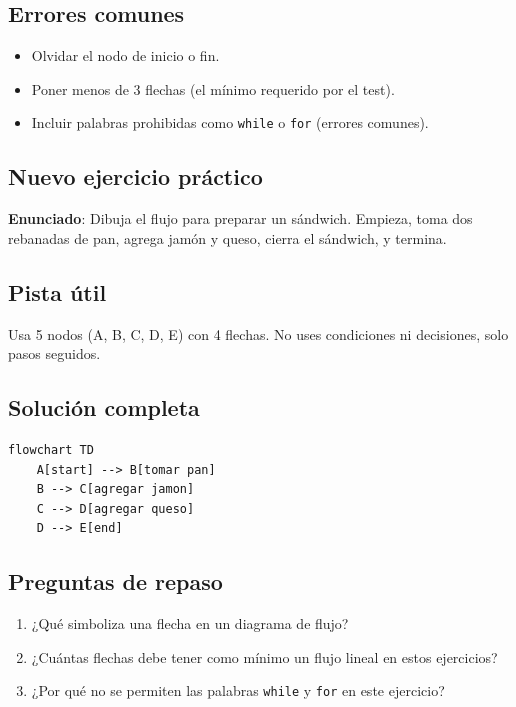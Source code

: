 \documentclass[12pt]{article}
\begin{document}
\subsection{Errores comunes}

\begin{itemize}
    \item Olvidar el nodo de inicio o fin.
    \item Poner menos de 3 flechas (el mínimo requerido por el test).
    \item Incluir palabras prohibidas como \texttt{while} o \texttt{for} (errores comunes).
\end{itemize}

\subsection{Nuevo ejercicio práctico}

\textbf{Enunciado}: Dibuja el flujo para preparar un sándwich. Empieza, toma dos rebanadas de pan, agrega jamón y queso, cierra el sándwich, y termina.

\subsection{Pista útil}

Usa 5 nodos (A, B, C, D, E) con 4 flechas. No uses condiciones ni decisiones, solo pasos seguidos.

\subsection{Solución completa}

\begin{lstlisting}[style=mermaidstyle]
flowchart TD
    A[start] --> B[tomar pan]
    B --> C[agregar jamon]
    C --> D[agregar queso]
    D --> E[end]
\end{lstlisting}

\subsection{Preguntas de repaso}

\begin{enumerate}
    \item ¿Qué simboliza una flecha en un diagrama de flujo?
    \item ¿Cuántas flechas debe tener como mínimo un flujo lineal en estos ejercicios?
    \item ¿Por qué no se permiten las palabras \texttt{while} y \texttt{for} en este ejercicio?
\end{enumerate}
\end{document}
